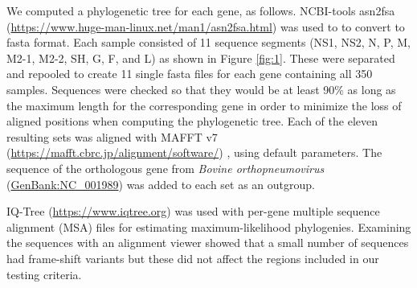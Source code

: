 \documentclass{article} %
\begin{document}
We computed a phylogenetic tree for each gene, as follows.
NCBI-tools asn2fsa (\url{https://www.huge-man-linux.net/man1/asn2fsa.html}) was used to to convert to fasta format.
Each sample consisted of 11 sequence segments
(NS1, NS2, N, P, M, M2-1, M2-2, SH, G, F, and L) as shown in 
Figure \ref{fig:1}.
These were separated and repooled to create 11 single fasta files for each gene containing all 350 samples. 
Sequences were checked so that they would be at least 90\% as long as the maximum length 
for the corresponding gene in order to minimize the loss of aligned positions when computing the phylogenetic tree. 
Each of the eleven resulting sets was aligned with MAFFT v7 (\url{https://mafft.cbrc.jp/alignment/software/})
\citep{katoh2013mafft},
using default  parameters.
The sequence of the orthologous gene from  \textit{Bovine orthopneumovirus} 
(\href{https://www.ncbi.nlm.nih.gov/nuccore/NC_001989}{GenBank:NC\_001989}) 
was added to each set as an outgroup. 

IQ-Tree 
(\url{https://www.iqtree.org})
\citep{nguyen2015iq}
was used with per-gene multiple sequence alignment (MSA) files for estimating maximum-likelihood phylogenies.
Examining the sequences with an alignment viewer showed that a small number of sequences had frame-shift variants but these did not affect the regions included in our testing criteria.
\end{document}

